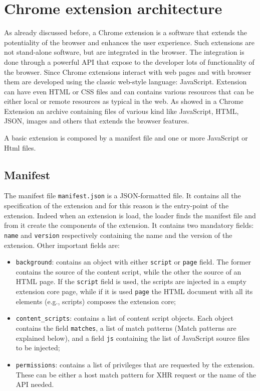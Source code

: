 \section{Chrome extension architecture}
\label{sec:ExtDetails}
As already discussed before, a Chrome extension is a software that extends the potentiality of the browser and enhances the user experience. Such extensions are not stand-alone software, but are integrated in the browser. The integration is done through a powerful API that expose to the developer lots of functionality of the browser. Since Chrome extensions interact with web pages and with browser them are developed using the classic web-style language: JavaScript. Extension can have even HTML or CSS files and can contains various resources that can be either local or remote resources as typical in the web. 
As showed in \cite{ChromeExtensionOnline} a Chrome Extension  an archive containing files of various kind like JavaScript, HTML, JSON, images and others that extends the browser features.

A basic extension is composed by a manifest file and one or more JavaScript or Html files.

\subsection{Manifest}
The manifest file \texttt{manifest.json} is a JSON-formatted file. It contains all the specification of the extension and for this reason is the entry-point of the extension. Indeed when an extension is load, the loader finds the manifest file and from it create the components of the extension. It contains two mandatory fields: \texttt{name} and \texttt{version} respectively containing the name and the version of the extension. Other important fields are:
\begin{itemize}
\item \texttt{background}: contains an object with either \texttt{script} or \texttt{page} field. The former contains the source of the content script, while the other the source of an HTML page. If the \texttt{script} field is used, the scripts are injected in a empty extension core page, while if it is used \texttt{page} the HTML document with all its elements (e.g., scripts) composes the extension core;
\item \texttt{content\_scripts}: contains a list of content script objects. Each object contains the field \texttt{matches}, a list of match patterns (Match patterns are explained below), and a field \texttt{js} containing the list of JavaScript source files to be injected;
\item \texttt{permissions}: contains a list of privileges that are requested by the extension. These can be either a host match pattern for XHR request or the name of the API needed.
\end{itemize}

